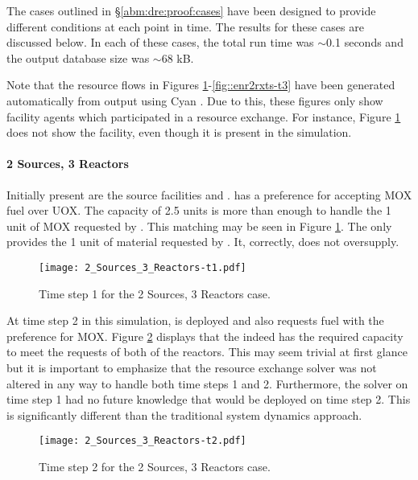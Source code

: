 The cases outlined in \S \ref{abm:dre:proof:cases} have been designed to provide
different conditions at each point in time.  The results for these cases are
discussed below. In each of these cases, the total \Cyclus{} run time was
$\sim$0.1 seconds and the output database size was $\sim$68 kB.

Note that the resource flows in Figures
\ref{fig::2srcs3rxts-t1}-\ref{fig::enr2rxts-t3} have been generated
automatically from \Cyclus{} output using Cyan \cite{Carlsen2014}.  Due to this,
these figures only show facility agents which participated in a resource
exchange. For instance, Figure \ref{fig::2srcs3rxts-t1} does not show the
\UOXSource{} facility, even though it is present in the simulation.

\paragraph{2 Sources, 3 Reactors}

Initially present are the source facilities and .   has a
preference for accepting MOX fuel over UOX.  The \MOXSource{} capacity of 2.5
units is more than enough to handle the 1 unit of MOX requested by .
This matching may be seen in Figure \ref{fig::2srcs3rxts-t1}. The \MOXSource{}
only provides the 1 unit of material requested by .  It, correctly,
does not oversupply.

\begin{figure}
  \begin{center}
    \texttt{[image: 2\_Sources\_3\_Reactors-t1.pdf]}
    \caption[]{\label{fig::2srcs3rxts-t1}Time step 1 for the 2 Sources, 3 Reactors 
        case.}
  \end{center}
\end{figure}

At time step 2 in this simulation,  is deployed and also requests
fuel with the preference for MOX.  Figure \ref{fig::2srcs3rxts-t2} displays that
the \MOXSource{} indeed has the required capacity to meet the requests of both
of the reactors.  This may seem trivial at first glance but it is important to
emphasize that the resource exchange solver was not altered in any way to handle
both time steps 1 and 2.  Furthermore, the solver on time step 1 had no future
knowledge that  would be deployed on time step 2.  This is
significantly different than the traditional system dynamics approach.

\begin{figure}
  \begin{center}
    \texttt{[image: 2\_Sources\_3\_Reactors-t2.pdf]}
    \caption[]{\label{fig::2srcs3rxts-t2}Time step 2 for the 2 Sources, 3 Reactors 
        case.}
  \end{center}
\end{figure}

